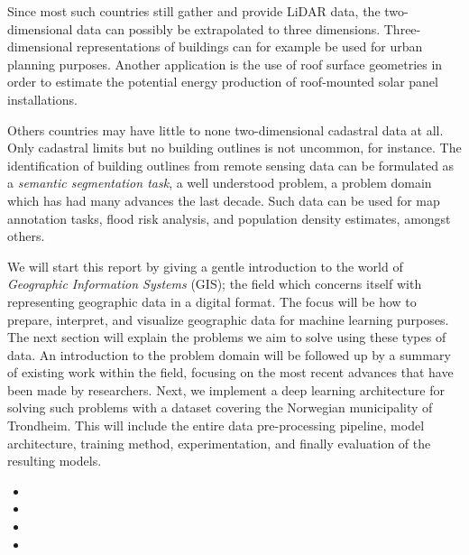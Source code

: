 Since most such countries still gather and provide LiDAR data, the two-dimensional data can possibly be extrapolated to three dimensions.
Three-dimensional representations of buildings can for example be used for urban planning purposes.
Another application is the use of roof surface geometries in order to estimate the potential energy production of roof-mounted solar panel installations.

Others countries may have little to none two-dimensional cadastral data at all.
Only cadastral limits but no building outlines is not uncommon, for instance.
The identification of building outlines from remote sensing data can be formulated as a \textit{semantic segmentation task}, a well understood problem, a problem domain which has had many advances the last decade.
Such data can be used for map annotation tasks, flood risk analysis, and population density estimates, amongst others.

We will start this report by giving a gentle introduction to the world of \textit{Geographic Information Systems} (GIS); the field which concerns itself with representing geographic data in a digital format.
The focus will be how to prepare, interpret, and visualize geographic data for machine learning purposes.
The next section will explain the problems we aim to solve using these types of data.
An introduction to the problem domain will be followed up by a summary of existing work within the field, focusing on the most recent advances that have been made by researchers.
Next, we implement a deep learning architecture for solving such problems with a dataset covering the Norwegian municipality of Trondheim.
This will include the entire data pre-processing pipeline, model architecture, training method, experimentation, and finally evaluation of the resulting models.

\begin{itemize}
  \item {}
  \item {}
  \item {}
  \item {}
\end{itemize}
